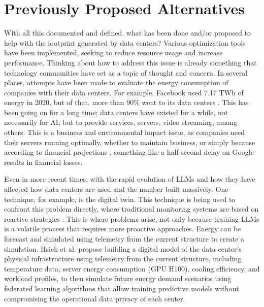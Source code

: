 \documentclass[conference]{IEEEtran}
\begin{document}
\section{Previously Proposed Alternatives}

With all this documented and defined, what has been done and/or proposed to help with the footprint generated by data centers? Various optimization tools have been implemented, seeking to reduce resource usage and increase performance. Thinking about how to address this issue is already something that technology communities have set as a topic of thought and concern. In several places, attempts have been made to evaluate the energy consumption of companies with their data centers. For example, Facebook used 7.17 TWh of energy in 2020, but of that, more than 90\% went to its data centers \cite{Zakarya2024}. This has been going on for a long time; data centers have existed for a while, not necessarily for AI, but to provide services, servers, video streaming, among others. This is a business and environmental impact issue, as companies need their servers running optimally, whether to maintain business, or simply because according to financial projections \cite{Zakarya2024}, something like a half-second delay on Google results in financial losses.

Even in more recent times, with the rapid evolution of LLMs and how they have affected how data centers are used and the number built massively. One technique, for example, is the digital twin. This technique is being used to confront this problem directly, where traditional monitoring systems are based on reactive strategies \cite{Hsieh2026}. This is where problems arise, not only because training LLMs is a volatile process that requires more proactive approaches. Energy can be forecast and simulated using telemetry from the current structure to create a simulation. Hsieh et al. \cite{Hsieh2026} propose building a digital model of the data center's physical infrastructure using telemetry from the current structure, including temperature data, server energy consumption (GPU H100), cooling efficiency, and workload profiles, to then simulate future energy demand scenarios using federated learning algorithms that allow training predictive models without compromising the operational data privacy of each center.
\end{document}
